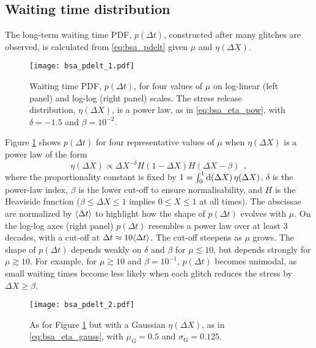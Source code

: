\subsection{Waiting time distribution}
The long-term waiting time PDF, $p(\Delta t)$, constructed after many glitches are observed, is calculated from \eqref{eq:bsa_pdelt} given $\mu$ and $\eta(\Delta X)$. 
\begin{figure}
\centering
\texttt{[image: bsa\_pdelt\_1.pdf]}
\caption{Waiting time PDF, $p(\Delta t)$, for four values of $\mu$ on log-linear (left panel) and log-log (right panel) scales. The stress release distribution, $\eta(\Delta X)$, is a power law, as in \eqref{eq:bsa_eta_pow}, with $\delta=-1.5$ and $\beta=10^{-2}$.}
\label{fig:bsa_pdelt_pow}
\end{figure}
Figure \ref{fig:bsa_pdelt_pow} shows $p(\Delta t)$ for four representative values of $\mu$ when $\eta(\Delta X)$ is a power law of the form
\begin{equation}
\label{eq:bsa_eta_pow}
\eta(\Delta X) \propto \Delta X^{-\delta} H(1 - \Delta X) H(\Delta X - \beta)\ \ ,
\end{equation}
where the proportionality constant is fixed by $1 = \int_0^1 \textrm{d} (\Delta X)\, \eta(\Delta X)$, $\delta$ is the power-law index, $\beta$ is the lower cut-off to ensure normalisability, and $H$ is the Heaviside function ($\beta \leq \Delta X \leq 1$ implies $0 \leq X \leq 1$ at all times). The abscissae are normalized by $\langle \Delta t \rangle$ to highlight how the shape of $p(\Delta t)$ evolves with $\mu$. On the log-log axes (right panel) $p(\Delta t)$ resembles a power law over at least 3 decades, with a cut-off at $\Delta t \approx 10 \langle \Delta t \rangle$. The cut-off steepens as $\mu$ grows. The shape of $p(\Delta t)$ depends weakly on $\delta$ and $\beta$ for $\mu \lesssim 10$, but depends strongly for $\mu \gtrsim 10$. For example, for $\mu \gtrsim 10$ and $\beta = 10^{-1}$, $p(\Delta t)$ becomes unimodal, as small waiting times become less likely when each glitch reduces the stress by $\Delta X \geq \beta$. 

\begin{figure}
\centering
\texttt{[image: bsa\_pdelt\_2.pdf]}
\caption{As for Figure \ref{fig:bsa_pdelt_pow} but with a Gaussian $\eta(\Delta X)$, as in \eqref{eq:bsa_eta_gauss}, with $\mu_\textrm{G}=0.5$ and $\sigma_\textrm{G}=0.125$.}
\label{fig:bsa_pdelt_gauss}
\end{figure}

